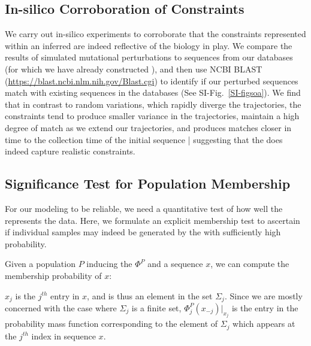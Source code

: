 \documentclass[onecolumn,10pt]{IEEEtran}
\begin{document}
\subsection*{In-silico Corroboration of \qnet Constraints}

We carry out in-silico experiments to corroborate that the constraints represented within an inferred \qnet are indeed reflective of the  biology in play. We compare the results of simulated mutational perturbations to sequences from our databases (for which we have already constructed ), and then use NCBI BLAST (\href{https://blast.ncbi.nlm.nih.gov/Blast.cgi}{https://blast.ncbi.nlm.nih.gov/Blast.cgi}) to identify  if  our perturbed sequences match with existing sequences in the databases (See  SI-Fig.~\ref{SI-figsoa}). We find that in contrast to random variations, which rapidly diverge the trajectories, the \qnet constraints tend to produce smaller variance in the trajectories, maintain a high degree of match as we extend our trajectories, and produces matches closer in time to the collection time of the  initial sequence | suggesting that the \qnet  does indeed capture realistic constraints.





\subsection*{Significance Test for Population Membership}

For our modeling to be reliable, we need a quantitative test of how well the \qnet represents the data. Here, we formulate an explicit membership test to ascertain if individual samples may indeed be generated by the \qnet with sufficiently high probability.
%
\begin{defn}\label{defmem}
Given a population $P$ inducing the \qnet $\Phi^P$ and a sequence $x$, we can compute the membership probability of $x$:
\end{defn}
$x_j$ is the $j^{th}$ entry in $x$, and is thus an element in the set $\Sigma_j$. Since we are mostly concerned with the case where $\Sigma_j$ is a finite set, $\Phi^P_j(x_{-j}) \vert_{x_j}$ is the entry in the probability mass function corresponding to the element of $\Sigma_j$ which appears at the  $j^{th}$ index in sequence $x$. 
 
\end{document}

